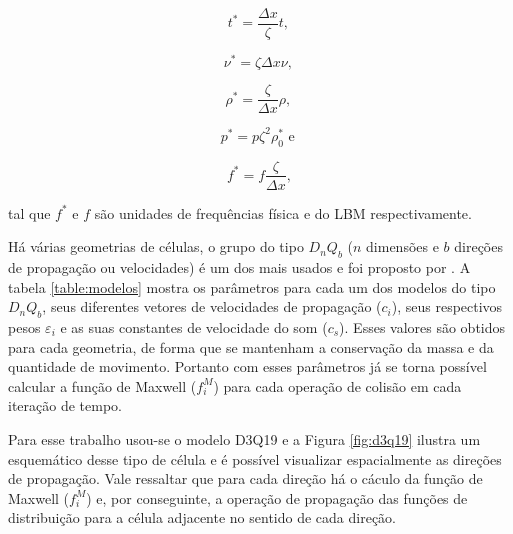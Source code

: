 \begin{equation}
  t^{*} = \frac{\Delta x}{\zeta}t \text{, }
  \label{eq:conversao_4}
\end{equation}

\begin{equation}
  \nu^{*} = \zeta \Delta x \nu\text{, }
  \label{eq:conversao_5}
\end{equation}

\begin{equation}
  \rho^{*} = \frac{\zeta}{\Delta x} \rho \text{, }
  \label{eq:conversao_6}
\end{equation}

\begin{equation}
  p^{*} = p \zeta^{2}  \rho^{*}_{0} \text{ e }
  \label{eq:conversao_7}
\end{equation}

\begin{equation}
  f^{*} = f\frac{\zeta}{\Delta x},
  \label{eq:conversao_8}
\end{equation}

tal que $f^{*}$ e $f$ são unidades de frequências física e do LBM respectivamente.

Há várias geometrias de células, o grupo do tipo $D_{n}Q_{b}$ ($n$ dimensões e $b$ direções de propagação ou velocidades) é um dos mais usados e foi proposto por . A tabela \ref{table:modelos} mostra os parâmetros para cada um dos modelos do tipo $D_{n}Q_{b}$, seus diferentes vetores de velocidades de propagação ($c_{i}$), seus respectivos pesos $\varepsilon_{i}$ e as suas constantes de velocidade do som ($c_{s}$). Esses valores são obtidos para cada geometria, de forma que se mantenham a conservação da massa e da quantidade de movimento. Portanto com esses parâmetros já se torna possível calcular a função de Maxwell ($f_{i}^{M}$) para cada operação de colisão em cada iteração de tempo.

Para esse trabalho usou-se o modelo D3Q19 e a Figura \ref{fig:d3q19} ilustra um esquemático desse tipo de célula e é possível visualizar espacialmente as direções de propagação. Vale ressaltar que para cada direção há o cáculo da função de Maxwell ($f_{i}^{M}$) e, por conseguinte, a operação de propagação das funções de distribuição para a célula adjacente no sentido de cada direção.

